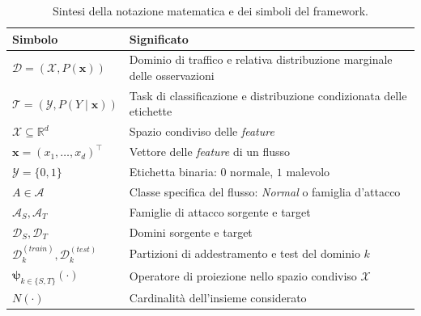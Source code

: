 \begin{table}[H]
    \centering
    \small
    \caption{Sintesi della notazione matematica e dei simboli del framework.}
    \label{tab:notazione_matematica}
    \begin{tabularx}{\textwidth}{
        >{\raggedright\arraybackslash}p{3cm}
        >{\raggedright\arraybackslash}X
    }
        \toprule
        \textbf{Simbolo} & \textbf{Significato} \\
        \midrule

        $\mathcal{D} = (\mathcal{X}, P(\mathbf{x}))$ &
        Dominio di traffico e relativa distribuzione marginale delle osservazioni \\

        $\mathcal{T} = (\mathcal{Y}, P(Y \mid \mathbf{x}))$ &
        Task di classificazione e distribuzione condizionata delle etichette \\

        $\mathcal{X} \subseteq \mathbb{R}^d$ &
        Spazio condiviso delle \textit{feature} \\

        $\mathbf{x} = (x_1, \dots, x_d)^\top$ &
        Vettore delle \textit{feature} di un flusso \\

        $\mathcal{Y} = \{0,1\}$ &
        Etichetta binaria: $0$ normale, $1$ malevolo \\

        $A \in \mathcal{A}$ &
        Classe specifica del flusso: \textit{Normal} o famiglia d'attacco \\

        $\mathcal{A}_S, \mathcal{A}_T$ &
        Famiglie di attacco sorgente e target \\

        $\mathcal{D}_S, \mathcal{D}_T$ &
        Domini sorgente e target \\

        $\mathcal{D}_k^{(train)}, \mathcal{D}_k^{(test)}$ &
        Partizioni di addestramento e test del dominio $k$ \\

        $\boldsymbol{\psi}_{k \in \{S,T\}}(\cdot)$ &
        Operatore di proiezione nello spazio condiviso $\mathcal{X}$ \\

        $N(\cdot)$ &
        Cardinalità dell'insieme considerato \\

        \bottomrule
    \end{tabularx}
\end{table}

